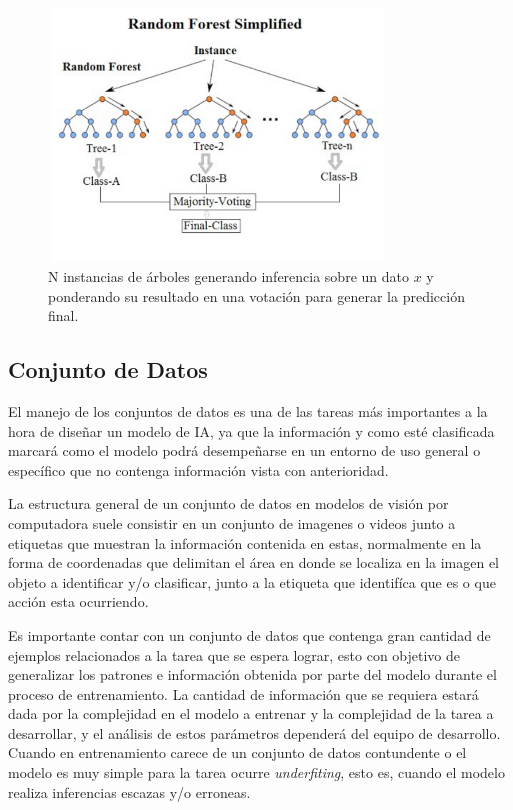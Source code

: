 \documentclass[letter,12pt]{report}
\begin{document}
\begin{figure}[H]
    \centering
    \includegraphics[width=0.8\textwidth]{forest}
    \caption{N instancias de árboles generando inferencia sobre un dato $x$ y ponderando
    su resultado en una votación para generar la predicción final.}
    \label{fig:forest}
\end{figure}

\subsection{Conjunto de Datos}
El manejo de los conjuntos de datos \cite{Manage} es una de las tareas más importantes a la hora de
diseñar un modelo de IA, ya que la información y como esté clasificada marcará como el
modelo podrá desempeñarse en un entorno de uso general o específico que no contenga
información vista con anterioridad.

La estructura general de un conjunto de datos en modelos de visión por computadora suele
consistir en un conjunto de imagenes o videos junto a etiquetas que muestran la
información contenida en estas, normalmente en la forma de coordenadas que delimitan el
área en donde se localiza en la imagen el objeto a identificar y/o clasificar, junto a la
etiqueta que identifíca que es o que acción esta ocurriendo.

Es importante contar con un conjunto de datos que contenga gran cantidad de ejemplos
relacionados a la tarea que se espera lograr, esto con objetivo de generalizar los
patrones e información obtenida por parte del modelo durante el proceso de entrenamiento.
La cantidad de información que se requiera estará dada por la complejidad en el modelo a
entrenar y la complejidad de la tarea a desarrollar, y el análisis de estos parámetros
dependerá del equipo de desarrollo. Cuando en entrenamiento carece de un conjunto de
datos contundente o el modelo es muy simple para la tarea ocurre \textit{underfiting},
esto es, cuando el modelo realiza inferencias escazas y/o erroneas.
\end{document}
